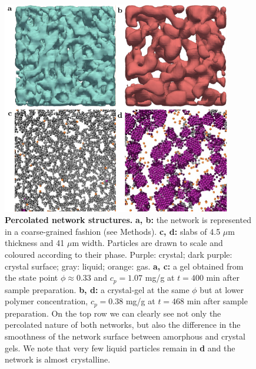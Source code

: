 \documentclass[preprint,amsmath,amssymb,superscriptaddress]{revtex4-1}
\begin{document}
% 

\begin{figure}
 \includegraphics[width=10cm]{network}
\caption{{\bf Percolated network structures.} 
{\bf a, b:} the network is represented in a coarse-grained fashion (see Methods).
{\bf c, d:} slabs of 4.5 $\mu$m thickness and 41 $\mu$m width. Particles are drawn to scale and coloured according to their phase. Purple: crystal; dark purple: crystal surface; gray: liquid; orange: gas. 
{\bf a, c:} a gel obtained from the state point $\phi\approx 0.33$ and $c_p=1.07$ mg/g at $t=400$ min after sample preparation. 
{\bf b, d:} a crystal-gel at the same $\phi$ but at lower polymer concentration, $c_p=0.38$ mg/g at $t=468$ min after sample preparation. 
On the top row we can clearly see not only the percolated nature of both networks, but also the difference in the smoothness of the network surface between amorphous and crystal gels. 
We note that very few liquid particles remain in \textbf{d} and the network is almost crystalline. 
} 
\label{fig:network}
\end{figure}
\end{document}
